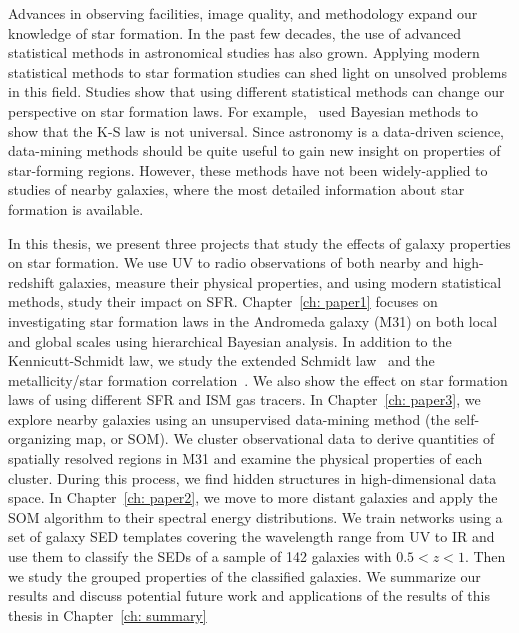 Advances in observing facilities, image quality, and methodology expand our knowledge of star formation. 
In the past few decades, the use of advanced statistical methods in astronomical studies has also grown.
Applying modern statistical methods to star formation studies can shed light on unsolved problems in this field. 
Studies show that using different statistical methods can change our perspective on star formation laws. 
For example,~\cite{Shetty13} used Bayesian methods to show that the K-S law is not universal. 
Since astronomy is a data-driven science, data-mining methods should be quite useful to gain new insight on properties of star-forming regions. However, these methods have not been widely-applied to studies of nearby galaxies, where the most detailed information about star formation is available.


In this thesis, we present three projects that study the effects of galaxy properties on star formation.
We use UV to radio observations of both nearby and high-redshift galaxies, measure their physical properties, and using modern statistical methods, study their impact on SFR.
Chapter~\ref{ch: paper1} focuses on investigating star formation laws in the Andromeda galaxy (M31) on both local and global scales using hierarchical Bayesian analysis.
In addition to the Kennicutt-Schmidt law, we study the extended Schmidt law~\citep{Shi11} and the metallicity/star formation correlation~\citep{Krumholz09}.
We also show the effect on star formation laws of using different SFR and ISM gas tracers.
In Chapter~\ref{ch: paper3}, we explore nearby galaxies using an unsupervised data-mining method (the self-organizing map, or SOM).
We cluster observational data to derive quantities of spatially resolved regions in M31 and examine the physical properties of each cluster.
During this process, we find hidden structures in high-dimensional data space.
In Chapter~\ref{ch: paper2}, we move to more distant galaxies and apply the SOM algorithm to their spectral energy distributions.
We train networks using a set of galaxy SED templates covering the wavelength range from UV to IR and use them to classify the SEDs of a sample of 142 galaxies with $0.5 < z < 1$. 
Then we study the grouped properties of the classified galaxies.
We summarize our results and discuss potential future work and applications of the results of this thesis in Chapter~\ref{ch: summary}

